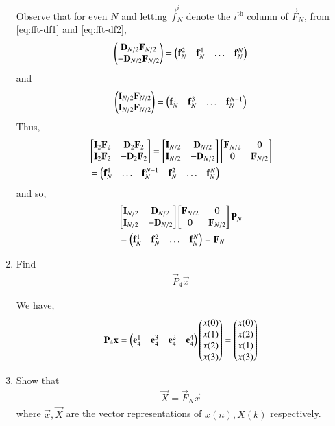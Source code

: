 \documentclass[journal,12pt,twocolumn]{IEEEtran}
\renewcommand\thesection{\arabic{section}}
\begin{document}
\begin{enumerate}[label=\thesection.\arabic*.,ref=\thesection.\theenumi]
\solution Observe that for even $N$ and letting $\vec{f}_N^i$ denote the $i^{\text{th}}$ column of $\vec{F}_N$, from \eqref{eq:fft-df1} and \eqref{eq:fft-df2},
\begin{align}
	\begin{pmatrix}\mathbf{D}_{N/2}\mathbf{F}_{N/2} \\ -\mathbf{D}_{N/2}\mathbf{F}_{N/2}\end{pmatrix} = \begin{pmatrix}\mathbf{f}_N^{2} & \mathbf{f}_N^{4} & \ldots & \mathbf{f}_N^{N}\end{pmatrix}
\end{align}
and
\begin{align}
	\begin{pmatrix}\mathbf{I}_{N/2}\mathbf{F}_{N/2} \\ \mathbf{I}_{N/2}\mathbf{F}_{N/2}\end{pmatrix} = \begin{pmatrix}\mathbf{f}_N^{1} & \mathbf{f}_N^{3} & \ldots & \mathbf{f}_N^{N - 1}\end{pmatrix}
\end{align}
Thus,
\begin{align}
	&\begin{bmatrix}\mathbf{I}_2\mathbf{F}_2 & \mathbf{D}_2\mathbf{F}_2 \\ \mathbf{I}_2\mathbf{F}_2 & -\mathbf{D}_2\mathbf{F}_2\end{bmatrix} = \begin{bmatrix}\mathbf{I}_{N/2} & \mathbf{D}_{N/2} \\ \mathbf{I}_{N/2} & -\mathbf{D}_{N/2}\end{bmatrix}\begin{bmatrix}\mathbf{F}_{N/2} & 0 \\ 0 & \mathbf{F}_{N/2}\end{bmatrix} \nonumber \\
	&= \begin{pmatrix}\mathbf{f}_N^{1} & \ldots & \mathbf{f}_N^{N - 1} & \mathbf{f}_N^{2} & \ldots & \mathbf{f}_N^{N}\end{pmatrix}
\end{align}
and so,
\begin{align}
	&\begin{bmatrix}\mathbf{I}_{N/2} & \mathbf{D}_{N/2} \\ \mathbf{I}_{N/2} & -\mathbf{D}_{N/2}\end{bmatrix}\begin{bmatrix}\mathbf{F}_{N/2} & 0 \\ 0 & \mathbf{F}_{N/2}\end{bmatrix}\mathbf{P}_{N} \nonumber \\
	&= \begin{pmatrix}\mathbf{f}_N^{1} & \mathbf{f}_N^{2} & \ldots & \mathbf{f}_N^{N}\end{pmatrix} = \mathbf{F}_N
\end{align}
\item Find 
    \begin{align}
	     \vec{P}_4 \vec{x}
    \end{align}

\solution We have,
\begin{align}
	\mathbf{P}_4\mathbf{x} = \begin{pmatrix}\mathbf{e}_4^1 & \mathbf{e}_4^3 & \mathbf{e}_4^2 & \mathbf{e}_4^4\end{pmatrix}\begin{pmatrix}x(0)\\x(1)\\x(2)\\x(3)\end{pmatrix} = \begin{pmatrix}x(0)\\x(2)\\x(1)\\x(3)\end{pmatrix}
	\label{eq:x-permute}
\end{align}
\item Show that 
    \begin{align}
	    \vec{X} = \vec{F}_N\vec{x}
	    \label{eq:dft-mat-def}
    \end{align}
		where $\vec{x}, \vec{X}$ are the vector representations of $x(n), X(k)$ respectively.


\end{enumerate}
\end{document}
